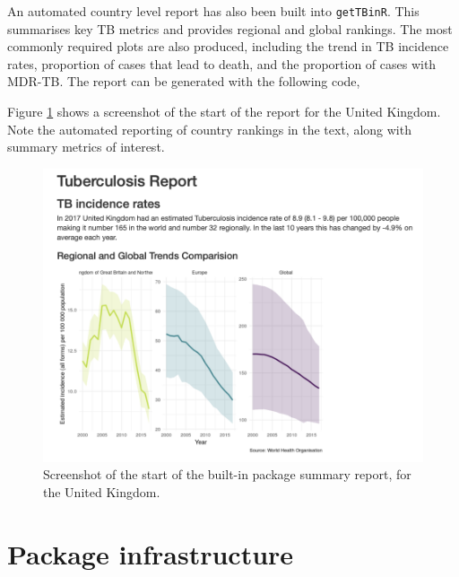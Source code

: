 \documentclass[11pt,twoside]{bristolthesis}
\begin{document}
  An automated country level report has also been built into \texttt{getTBinR}. This summarises key TB metrics and provides regional and global rankings. The most commonly required plots are also produced, including the trend in TB incidence rates, proportion of cases that lead to death, and the proportion of cases with MDR-TB. The report can be generated with the following code,
  \begin{Shaded}
  \begin{Highlighting}[]
  \NormalTok{(} \NormalTok{, } \NormalTok{)}
  \end{Highlighting}
  \end{Shaded}
  Figure \ref{fig:report-snapshot} shows a screenshot of the start of the report for the United Kingdom. Note the automated reporting of country rankings in the text, along with summary metrics of interest.
  \begin{figure}
  
  {\centering \includegraphics[width=0.8\linewidth]{chapters/getTBinR/img/ExampleCountryReport} 
  
  }
  
  \caption{Screenshot of the start of the built-in package summary report, for the United Kingdom.}\label{fig:report-snapshot}
  \end{figure}
  \hypertarget{package-infrastructure}{%
  \section{Package infrastructure}\label{package-infrastructure}}
  
\end{document}
